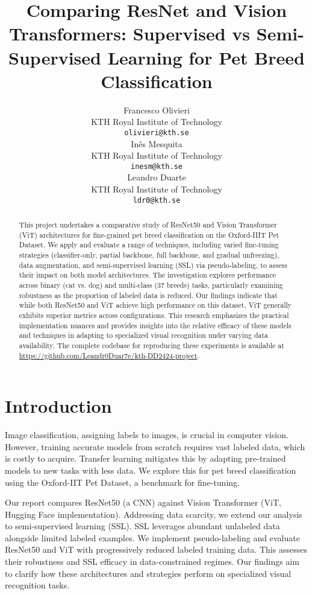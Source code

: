\documentclass{article}
\title{Comparing ResNet and Vision Transformers: Supervised vs Semi-Supervised Learning for Pet Breed Classification}
\author{%
  Francesco Olivieri \\
  KTH Royal Institute of Technology \\
  \texttt{olivieri@kth.se} \\
  \And
  Inês Mesquita \\
  KTH Royal Institute of Technology \\
  \texttt{inesm@kth.se} \\
  \And
  Leandro Duarte \\
  KTH Royal Institute of Technology \\
  \texttt{ldr0@kth.se} \\
}
\begin{document}
\maketitle

\begin{abstract}
This project undertakes a comparative study of ResNet50 and Vision Transformer (ViT) architectures for fine-grained pet breed classification on the Oxford-IIIT Pet Dataset. We apply and evaluate a range of techniques, including varied fine-tuning strategies (classifier-only, partial backbone, full backbone, and gradual unfreezing), data augmentation, and semi-supervised learning (SSL) via pseudo-labeling, to assess their impact on both model architectures. The investigation explores performance across binary (cat vs. dog) and multi-class (37 breeds) tasks, particularly examining robustness as the proportion of labeled data is reduced. Our findings indicate that while both ResNet50 and ViT achieve high performance on this dataset, ViT generally exhibits superior metrics across configurations. This research emphasizes the practical implementation nuances and provides insights into the relative efficacy of these models and techniques in adapting to specialized visual recognition under varying data availability. The complete codebase for reproducing these experiments is available at \url{https://github.com/Leandr0Duar7e/kth-DD2424-project}.


\end{abstract}

\newpage
\section{Introduction}
Image classification, assigning labels to images, is crucial in computer vision. However, training accurate models from scratch requires vast labeled data, which is costly to acquire. Transfer learning mitigates this by adapting pre-trained models to new tasks with less data. We explore this for pet breed classification using the Oxford-IIT Pet Dataset, a benchmark for fine-tuning.

Our report compares ResNet50 (a CNN) against Vision Transformer (ViT, Hugging Face implementation). Addressing data scarcity, we extend our analysis to semi-supervised learning (SSL). SSL leverages abundant unlabeled data alongside limited labeled examples. We implement pseudo-labeling and evaluate ResNet50 and ViT with progressively reduced labeled training data. This assesses their robustness and SSL efficacy in data-constrained regimes. Our findings aim to clarify how these architectures and strategies perform on specialized visual recognition tasks.
\end{document}
